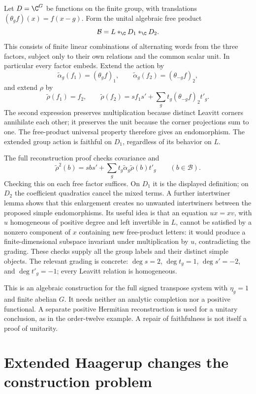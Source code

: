 Let $D=\C^G$ be functions on the finite group, with translations
$(\theta_gf)(x)=f(x-g)$. Form the unital algebraic free product
\[
 \mathcal B=L*_{\C}D_1*_{\C}D_2.
\]
This consists of finite linear combinations of alternating words
from the three factors, subject only to their own relations and
the common scalar unit. In particular every factor embeds. Extend
the action by
\[
 \widetilde\alpha_g(f_1)=(\theta_gf)_1,\qquad
 \widetilde\alpha_g(f_2)=(\theta_{-g}f)_2,
\]
and extend $\rho$ by
\[
 \widetilde\rho(f_1)=f_2,\qquad
 \widetilde\rho(f_2)=sf_1s'
       +\sum_gt_g(\theta_{-g}f)_2t'_g.
\]
The second expression preserves multiplication because distinct
Leavitt corners annihilate each other; it preserves the unit
because the corner projections sum to one. The free-product
universal property therefore gives an endomorphism. The extended
group action is faithful on $D_1$, regardless of its behavior on
$L$.

The full reconstruction proof checks covariance and
\[
 \widetilde\rho^2(b)=sbs'
       +\sum_gt_g\widetilde\alpha_g\widetilde\rho(b)t'_g
       \qquad(b\in\mathcal B).
\]
Checking this on each free factor suffices. On $D_1$ it is the
displayed definition; on $D_2$ the coefficient quadratics cancel
the mixed terms. A further intertwiner lemma shows that this
enlargement creates no unwanted intertwiners between the proposed
simple endomorphisms. Its useful idea is that an equation
$ux=xv$, with $u$ homogeneous of positive degree and left
invertible in $L$, cannot be satisfied by a nonzero component
of $x$ containing new free-product letters: it would produce a
finite-dimensional subspace invariant under multiplication by
$u$, contradicting the grading. These checks supply all the
group labels and their distinct simple objects.
The relevant grading is concrete:
$\deg s=2$, $\deg t_g=1$, $\deg s'=-2$, and
$\deg t'_g=-1$; every Leavitt relation is homogeneous.

This is an algebraic construction for the full signed transpose
system with $\eta_g=1$ and finite abelian $G$. It needs neither
an analytic completion nor a positive functional. A separate
positive Hermitian reconstruction is used for a unitary conclusion,
as in the order-twelve example. A repair of faithfulness is not
itself a proof of unitarity.

\section{Extended Haagerup changes the construction problem}


